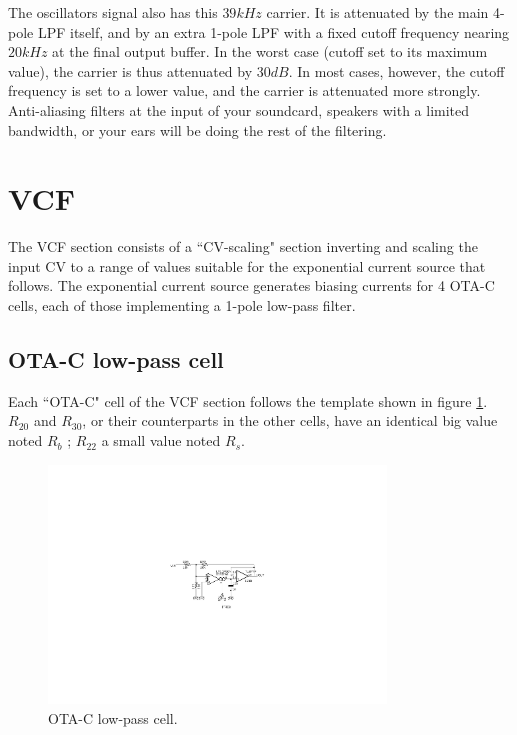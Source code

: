 \documentclass[a4paper,11pt]{article}
\begin{document}
The oscillators signal also has this $39kHz$ carrier. It is attenuated by the main 4-pole LPF itself, and by an extra 1-pole LPF with a fixed cutoff frequency nearing $20kHz$ at the final output buffer. In the worst case (cutoff set to its maximum value), the carrier is thus attenuated by $30dB$. In most cases, however, the cutoff frequency is set to a lower value, and the carrier is attenuated more strongly. Anti-aliasing filters at the input of your soundcard, speakers with a limited bandwidth, or your ears will be doing the rest of the filtering.

\section{VCF}
\label{sec:vcf}

The VCF section consists of a ``CV-scaling" section inverting and scaling the input CV to a range of values suitable for the exponential current source that follows. The exponential current source generates biasing currents for 4 OTA-C cells, each of those implementing a 1-pole low-pass filter.

\subsection{OTA-C low-pass cell}
\label{sec:otac}

Each ``OTA-C" cell of the VCF section follows the template shown in figure \ref{fig:otac}. $R_{20}$ and $R_{30}$, or their counterparts in the other cells, have an identical big value noted $R_b$ ; $R_{22}$ a small value noted $R_s$.

\begin{figure}
\centering
\includegraphics[width=0.8\textwidth]{smr4_otac_cell.pdf}
\caption{OTA-C low-pass cell.}
\label{fig:otac}
\end{figure}
\end{document}

